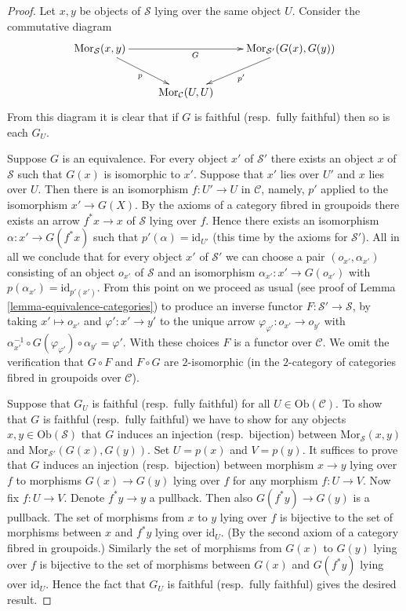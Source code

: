 \begin{proof}
Let $x, y$ be objects of $\mathcal{S}$ lying over the same object $U$.
Consider the commutative diagram
$$
\xymatrix{
\text{Mor}_{\mathcal{S}}(x, y) \ar[rd]_p \ar[rr]_{G} & &
\text{Mor}_{\mathcal{S}'}(G(x), G(y)) \ar[ld]^{p'} \\
& \text{Mor}_{\mathcal{C}}(U, U) &
}
$$
From this diagram it is clear that if $G$ is faithful (resp.\ fully faithful)
then so is each $G_U$.

\medskip\noindent
Suppose $G$ is an equivalence. For every object
$x'$ of $\mathcal{S}'$ there exists an object $x$ of $\mathcal{S}$
such that $G(x)$ is isomorphic to $x'$. Suppose that $x'$ lies
over $U'$ and $x$ lies over $U$. Then there is an isomorphism
$f : U' \to U$ in $\mathcal{C}$, namely, $p'$ applied to the
isomorphism $x' \to G(X)$. By the axioms of a category fibred
in groupoids there exists an arrow $f^*x \to x$ of $\mathcal{S}$
lying over $f$. Hence there exists an isomorphism
$\alpha : x' \to G(f^*x)$ such that $p'(\alpha) = \text{id}_{U'}$
(this time by the axioms for $\mathcal{S}'$). All in all we conclude
that for every object $x'$ of $\mathcal{S}'$ we can choose
a pair $(o_{x'}, \alpha_{x'})$ consisting of an object
$o_{x'}$ of $\mathcal{S}$ and an isomorphism $\alpha_{x'} : x' \to G(o_{x'})$
with $p(\alpha_{x'}) = \text{id}_{p'(x')}$.
From this point on we proceed as usual (see proof of
Lemma \ref{lemma-equivalence-categories}) to produce an inverse
functor $F : \mathcal{S}' \to \mathcal{S}$, by taking
$x' \mapsto o_{x'}$ and $\varphi' : x' \to y'$ to the unique
arrow $\varphi_{\varphi'} : o_{x'} \to o_{y'}$ with
$\alpha_{x'}^{-1} \circ G(\varphi_{\varphi'}) \circ \alpha_{y'}
= \varphi'$. With these choices $F$ is a functor over $\mathcal{C}$.
We omit the verification that $G \circ F$ and $F \circ G$ are
$2$-isomorphic (in the $2$-category of categories fibred in groupoids
over $\mathcal{C}$).

\medskip\noindent
Suppose that $G_U$ is faithful (resp.\ fully faithful)
for all $U\in\text{Ob}(\mathcal C)$. To
show that $G$ is faithful (resp.\ fully faithful)
we have to show for any objects
$x, y\in\text{Ob}(\mathcal{S})$ that $G$ induces an
injection (resp.\ bijection) between
$\text{Mor}_{\mathcal{S}}(x, y)$ and
$\text{Mor}_{\mathcal{S}'}(G(x), G(y))$.
Set $U = p(x)$ and $V = p(y)$.
It suffices to prove that $G$
induces an injection (resp.\ bijection) between morphism
$x \to y$ lying over $f$ to morphisms $G(x) \to G(y)$ lying over $f$
for any morphism $f : U \to V$.
Now fix $f : U \to V$. Denote $f^*y \to y$ a pullback.
Then also $G(f^*y) \to G(y)$ is a pullback.
The set of morphisms from $x$ to $y$ lying over $f$
is bijective to the set of morphisms between
$x$ and $f^*y$ lying over $\text{id}_U$. (By the second axiom
of a category fibred in groupoids.) Similarly
the set of morphisms from $G(x)$ to $G(y)$ lying over $f$
is bijective to the set of morphisms between
$G(x)$ and $G(f^*y)$ lying over $\text{id}_U$.
Hence the fact that $G_U$ is faithful (resp.\ fully faithful)
gives the desired result.


\end{proof}
